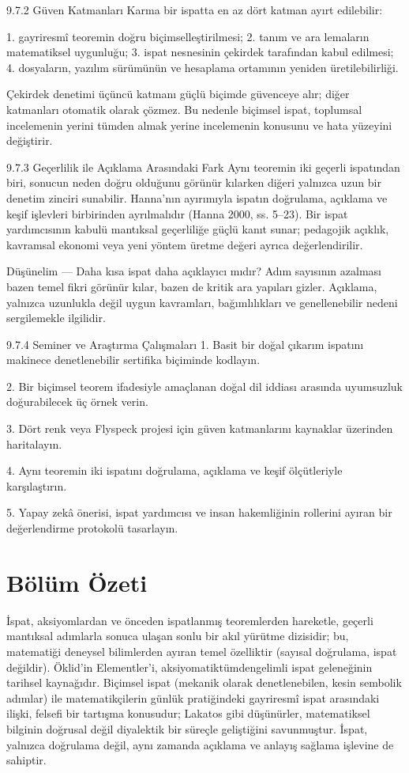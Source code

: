 9.7.2 Güven Katmanları Karma bir ispatta en az dört katman ayırt edilebilir:

1. gayriresmî teoremin doğru biçimselleştirilmesi; 2. tanım ve ara lemaların matematiksel uygunluğu; 3. ispat nesnesinin çekirdek tarafından kabul edilmesi; 4. dosyaların, yazılım sürümünün ve hesaplama ortamının yeniden üretilebilirliği.

Çekirdek denetimi üçüncü katmanı güçlü biçimde güvenceye alır; diğer katmanları otomatik olarak çözmez. Bu nedenle biçimsel ispat, toplumsal incelemenin yerini tümden almak yerine incelemenin konusunu ve hata yüzeyini değiştirir.

9.7.3 Geçerlilik ile Açıklama Arasındaki Fark Aynı teoremin iki geçerli ispatından biri, sonucun neden doğru olduğunu görünür kılarken diğeri yalnızca uzun bir denetim zinciri sunabilir. Hanna’nın ayırımıyla ispatın doğrulama, açıklama ve keşif işlevleri birbirinden ayrılmalıdır (Hanna 2000, ss. 5–23). Bir ispat yardımcısının kabulü mantıksal geçerliliğe güçlü kanıt sunar; pedagojik açıklık, kavramsal ekonomi veya yeni yöntem üretme değeri ayrıca değerlendirilir.

Düşünelim — Daha kısa ispat daha açıklayıcı mıdır? Adım sayısının azalması bazen temel fikri görünür kılar, bazen de kritik ara yapıları gizler. Açıklama, yalnızca uzunlukla değil uygun kavramları, bağımlılıkları ve genellenebilir nedeni sergilemekle ilgilidir.

9.7.4 Seminer ve Araştırma Çalışmaları 1. Basit bir doğal çıkarım ispatını makinece denetlenebilir sertifika biçiminde kodlayın.

2. Bir biçimsel teorem ifadesiyle amaçlanan doğal dil iddiası arasında uyumsuzluk doğurabilecek üç örnek verin.

3. Dört renk veya Flyspeck projesi için güven katmanlarını kaynaklar üzerinden haritalayın.

4. Aynı teoremin iki ispatını doğrulama, açıklama ve keşif ölçütleriyle karşılaştırın.

5. Yapay zekâ önerisi, ispat yardımcısı ve insan hakemliğinin rollerini ayıran bir değerlendirme protokolü tasarlayın.

\section*{Bölüm Özeti}

İspat, aksiyomlardan ve önceden ispatlanmış teoremlerden hareketle, geçerli mantıksal adımlarla sonuca ulaşan sonlu bir akıl yürütme dizisidir; bu, matematiği deneysel bilimlerden ayıran temel özelliktir (sayısal doğrulama, ispat değildir). Öklid’in Elementler’i, aksiyomatiktümdengelimli ispat geleneğinin tarihsel kaynağıdır. Biçimsel ispat (mekanik olarak denetlenebilen, kesin sembolik adımlar) ile matematikçilerin günlük pratiğindeki gayriresmî ispat arasındaki ilişki, felsefi bir tartışma konusudur; Lakatos gibi düşünürler, matematiksel bilginin doğrusal değil diyalektik bir süreçle geliştiğini savunmuştur. İspat, yalnızca doğrulama değil, aynı zamanda açıklama ve anlayış sağlama işlevine de sahiptir.

